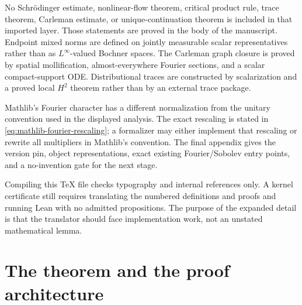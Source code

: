 \documentclass[11pt,oneside]{book}
\theoremstyle{definition}
\theoremstyle{remark}
\newcommand{\1}{\mathbf 1}
\begin{document}
No Schr\"odinger estimate, nonlinear-flow theorem, critical product rule,
trace theorem, Carleman estimate, or unique-continuation theorem is included
in that imported layer.  Those statements are proved in the body of the
manuscript.  Endpoint mixed norms are defined on jointly measurable scalar
representatives rather than as $L^\infty$-valued Bochner spaces.  The
Carleman graph closure is proved by spatial mollification, almost-everywhere
Fourier sections, and a scalar compact-support ODE.  Distributional traces
are constructed by scalarization and a proved local $H^2$ theorem rather than
by an external trace package.

Mathlib's Fourier character has a different normalization from the unitary
convention used in the displayed analysis.  The exact rescaling is stated in
\eqref{eq:mathlib-fourier-rescaling}; a formalizer may either implement that
rescaling or rewrite all multipliers in Mathlib's convention.  The final
appendix gives the version pin, object representations, exact existing
Fourier/Sobolev entry points, and a no-invention gate for the next stage.

Compiling this TeX file checks typography and internal references only.  A
kernel certificate still requires translating the numbered definitions and
proofs and running Lean with no admitted propositions.  The purpose of the
expanded detail is that the translator should face implementation work, not
an unstated mathematical lemma.

\tableofcontents

\mainmatter

\chapter{The theorem and the proof architecture}
\end{document}
